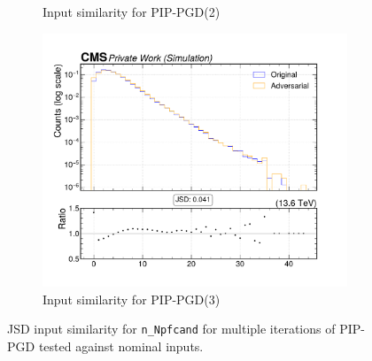 \begin{figure}[htbp]
\begin{subfigure}[t]{0.32\textwidth}
    \caption*{Input similarity for PIP-PGD(2)}
  \end{subfigure}\hfill
  \begin{subfigure}[t]{0.32\textwidth}
    \includegraphics[width=\linewidth]{media/output/features/compare/combined_it_3/cmp_global_features_n_Npfcand.pdf}
    \caption*{Input similarity for PIP-PGD(3)}
  \end{subfigure}

  \caption*{JSD input similarity for \texttt{n\_Npfcand} for multiple iterations of PIP-PGD tested against nominal inputs.}
  \label{fig:combined_input_n_Npfcand}
\end{figure}

